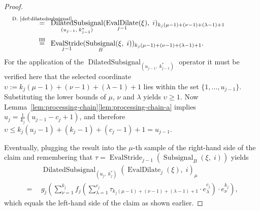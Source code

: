 \documentclass[journal]{IEEEtran}
\newcommand{\ROI}{B}
\newcommand{\discint}[2]{\{#1,\dotsc,#2\}}
\DeclareMathOperator{\Subsignal}{Subsignal}
\DeclareMathOperator{\EvalStride}{EvalStride}
\newcommand{\equsing}[1]{\overset{\mathclap{\text{#1}}}{=}}
\DeclareMathOperator{\DilatedSubsignal}{DilatedSubsignal}
\DeclareMathOperator{\EvalDilate}{EvalDilate}
\begin{document}
\begin{proof}
\begin{align*}
  \equsing{D.~\ref{def:dilatedsubsignal}}\ \ & \DilatedSubsignal_{(u_{j-1},\; k_{j - 1}^*)}(\EvalDilate_{j - 1}(\xi),\;i)_{k_j(\mu - 1) + (\nu - 1) + (\lambda - 1) + 1}\\
  \equsing{IH}\ \ & \EvalStride_{j - 1}(\Subsignal_\ROI(\xi,\; i))_{k_j(\mu - 1) + (\nu - 1) + (\lambda - 1) + 1}\text{.}
\end{align*}
For the application of the $\DilatedSubsignal_{(u_{j-1},\; k_{j - 1}^*)}$ operator it must be verified here that the selected coordinate $\upsilon := k_j(\mu - 1) + (\nu - 1) + (\lambda - 1) + 1$ lies within the set $\discint{1}{u_{j - 1}}$.
Substituting the lower bounds of $\mu$, $\nu$ and $\lambda$ yields $\upsilon \geq 1$.
Now Lemma~\ref{lem:processing-chain}\ref{lem:processing-chain-a} implies $u_j = \frac{1}{k_j}(u_{j - 1} - c_j + 1)$, and therefore $\upsilon \leq k_j(u_j - 1) + (k_j - 1) + (c_j - 1) + 1 = u_{j - 1}$.

Eventually, plugging the result into the $ \mu$-th sample of the right-hand side of the claim and remembering that $\tau = \EvalStride_{j - 1}(\Subsignal_\ROI(\xi,\;i))$ yields
\begin{align*}
  & \DilatedSubsignal_{(u_j,\; k_j^*)}(\EvalDilate_j(\xi),\; i)_\mu\\
  =\ \ & g_j\!\left( \sum\nolimits_{\nu = 1}^{k_j} f_j\!\left(\sum\nolimits_{\lambda = 1}^{c_j} \tau_{k_j(\mu - 1) + (\nu - 1) + (\lambda - 1) + 1}\cdot e_\lambda^{c_j}\right) \cdot e_\nu^{k_j} \right)\text{,}
\end{align*}
which equals the left-hand side of the claim as shown earlier.
\end{proof}
\end{document}
